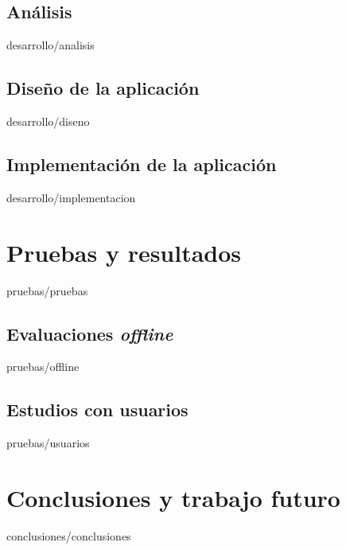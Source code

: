 \documentclass[epsbased,copyright,final,printable,covers,extendedindex,firstnumbered,tfm,gnuplot]{tfgtfmthesisuam}
\begin{document}
  \section{Análisis\label{SEC:ANALISIS}}{desarrollo/analisis}
  \section{Diseño de la aplicación\label{SEC:DISENO}}{desarrollo/diseno}
  \section{Implementación de la aplicación\label{SEC:IMPLEMENTACION}}{desarrollo/implementacion}



\chapter{Pruebas y resultados\label{CAP:PRUEBAS}}{pruebas/pruebas}
  \section{Evaluaciones \textit{offline}\label{SEC:EVALUACIONES_OFFLINE}}{pruebas/offline}
  \section{Estudios con usuarios\label{SEC:ESTUDIOS_USUARIOS}}{pruebas/usuarios}

\chapter{Conclusiones y trabajo futuro\label{CAP:CONCLUSIONES}}{conclusiones/conclusiones}

\end{document}
